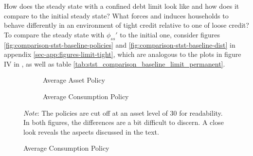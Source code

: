 \documentclass[12pt]{article} %
\numberwithin{equation}{section} %
\numberwithin{figure}{section}
\numberwithin{table}{section}
\begin{document}
How does the steady state with a confined debt limit look like and how does it compare to the initial steady state? What forces and induces households to behave differently in an environment of tight credit relative to one of loose credit? To compare the steady state with $\phi_{ss}'$ to the initial one, consider figures \ref{fig:comparison-stst-baseline-policies} and \ref{fig:comparison-stst-baseline-dist} in appendix \ref{sec-app:figures-limit-tight}, which are analogous to the plots in figure IV in \textcite[p.1443]{gl2017}, as well as table \ref{tab:stst_comparison_baseline_limit_permanent}. 

\begin{figure}[t]
    \caption{Baseline Model -- Shock to the Borrowing Limit: Household Policies}
    \label{fig:comparison-stst-baseline-policies}
    \centering
    \begin{subfigure}[b]{0.49\textwidth}
    \caption{Average Asset Policy}
    \label{fig:comparison-stst-baseline-policies-a}
         \centering
         
     \vspace{0.01cm}
     \end{subfigure}
     \hfill
     \begin{subfigure}[b]{0.49\textwidth}
     \caption{Average Consumption Policy}
     \label{fig:comparison-stst-baseline-policies-c}
         \centering
         
    \vspace{0.01cm}
     \end{subfigure}
     \justifying
     \footnotesize
	\textit{Note}: The policies are cut off at an asset level of $30$ for readability. In both figures, the differences are a bit difficult to discern. A close look reveals the aspects discussed in the text.
\end{figure}
\end{document}
